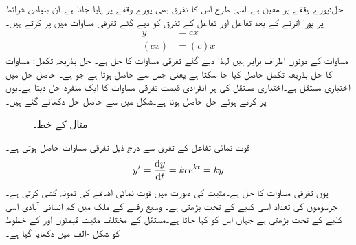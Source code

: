 حل:پورے وقفے پر  معین ہے۔اسی طرح اس کا تفرق  بھی پورے وقفے پر پایا جاتا ہے۔ان بنیادی شرائط پر پورا اترنے کے بعد تفاعل اور تفاعل کے تفرق کو دیے گئے تفرقی مساوات میں پر کرتے ہیں۔
\begin{align*}
y&=cx\\
(cx)&=(c)x
\end{align*}
مساوات کے دونوں اطراف برابر ہیں لہٰذا  دیے گئے تفرقی مساوات کا حل ہے۔
حل بذریعہ تکمل: مساوات  کا حل بذریعہ تکمل حاصل کیا جا سکتا ہے یعنی  جس سے  حاصل ہوتا ہے جو  ہے۔ حاصل حل میں  اختیاری مستقل ہے۔اختیاری مستقل کی ہر انفرادی قیمت تفرقی مساوات کا ایک منفرد حل دیتا ہے۔یوں  پر کرتے ہوئے  حل حاصل ہوتا ہے۔شکل  میں  سے حاصل حل دکھائے گئے ہیں۔
\begin{figure}
\centering
{}
\caption{مثال  کے خط۔}
\label{شکل_مثال_تفرقی_اول_حل_نسل_الف}
\end{figure}
قوت نمائی تفاعل  کے تفرق سے درج ذیل تفرقی مساوات حاصل ہوتی ہے۔
\begin{align*}
y'=\frac{\dif y}{\dif t}=k ce^{kt}=ky
\end{align*}
یوں  تفرقی مساوات کا حل  ہے۔مثبت  کی صورت میں  قوت نمائی اضافے کی نمونہ کشی کرتی ہے۔جرسوموں کی تعداد اسی کلیے کے تحت بڑھتی ہے۔ وسیع رقبے کے ملک میں کم انسانی آبادی اسی کلیے کے تحت بڑھتی ہے جہاں اس کو  کہا جاتا ہے۔مستقل  کے مختلف مثبت قیمتوں اور  کے خطوط کو شکل -الف میں دکھایا گیا ہے۔ 


